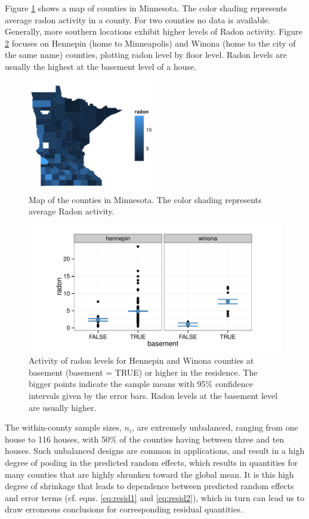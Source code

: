 \documentclass[12pt]{article} %
\newcommand{\hh}[1]{{\color{orange} #1}}
\begin{document}
Figure \ref{fig:map} shows a map of counties in Minnesota. The color shading represents average radon activity in a county. For two counties no data is available. Generally, more southern locations exhibit higher  levels of Radon activity. Figure \ref{fig:tc} focuses on Hennepin (home to Minneapolis) and Winona (home to the city of the same name) counties, plotting radon level by floor level. Radon levels are usually the highest at the basement level of a house. 
%
\begin{figure}[htb]
\centering
\includegraphics[width=0.5\textwidth]{figures/map.png}
\caption{\label{fig:map} Map of the counties in Minnesota. The color shading represents average Radon activity.}
\end{figure}
%
\begin{figure}[htb]
\centering
\includegraphics[width=0.7\linewidth]{figures/radon-twocounties.pdf}
\caption{\label{fig:tc} Activity of radon levels for Hennepin and Winona counties at basement \hh{(basement = TRUE) or higher in the residence}. The bigger points indicate the sample means with 95\% confidence intervals  given by the error bars. Radon levels at the basement level are usually higher.}
\end{figure}
%
The within-county sample sizes, $n_i$, are extremely unbalanced, ranging from one house to 116 houses, with 50\% of the counties having between three and ten houses. Such unbalanced designs are common in applications, and result in a high degree of pooling in the predicted random effects, which results in quantities for many counties that are highly shrunken toward the global mean. It is this high degree of shrinkage that leads to dependence between  predicted random effects and error terms (cf. eqns. \ref{eq:resid1} and \ref{eq:resid2}), which in turn can lead us to draw erroneous conclusions for corresponding residual quantities.
\end{document}
